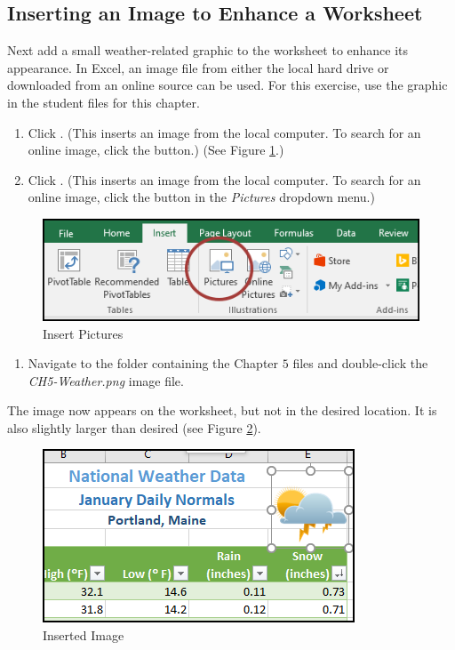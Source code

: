\subsection{Inserting an Image to Enhance a Worksheet}

Next add a small weather-related graphic to the worksheet to enhance its appearance. In Excel, an image file from either the local hard drive or downloaded from an online source can be used. For this exercise, use the graphic in the student files for this chapter.

\begin{enumerate}
	\item {} Click . (This inserts an image from the local computer. To search for an online image, click the  button.) (See Figure \ref{05:fig28}.)
	\item {} Click . (This inserts an image from the local computer. To search for an online image, click the  button in the \textit{Pictures} dropdown menu.)
\end{enumerate}

\begin{figure}[H]
	\centering
	\includegraphics[width=\maxwidth{.95\linewidth}]{gfx/ch05_fig28}
	\caption{Insert Pictures}
	\label{05:fig28}
\end{figure}

\begin{enumerate}[resume]
	\item Navigate to the folder containing the Chapter $ 5 $ files and double-click the \textit{CH5-Weather.png} image file.
\end{enumerate}

The image now appears on the worksheet, but not in the desired location. It is also slightly larger than desired (see Figure \ref{05:fig29}).

\begin{figure}[H]
	\centering
	\includegraphics[width=\maxwidth{.95\linewidth}]{gfx/ch05_fig29}
	\caption{Inserted Image}
	\label{05:fig29}
\end{figure}

